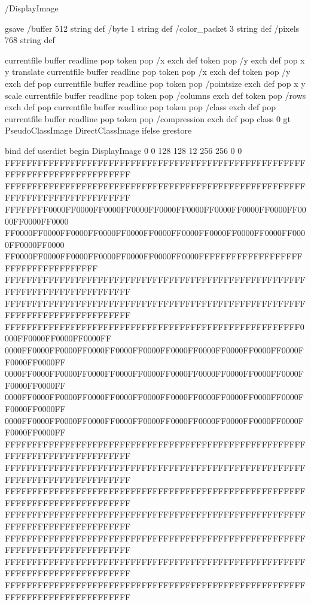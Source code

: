 /DisplayImage
{
  gsave
  /buffer 512 string def
  /byte 1 string def
  /color_packet 3 string def
  /pixels 768 string def

  currentfile buffer readline pop
  token pop /x exch def
  token pop /y exch def pop
  x y translate
  currentfile buffer readline pop
  token pop /x exch def
  token pop /y exch def pop
  currentfile buffer readline pop
  token pop /pointsize exch def pop
  x y scale
  currentfile buffer readline pop
  token pop /columns exch def
  token pop /rows exch def pop
  currentfile buffer readline pop
  token pop /class exch def pop
  currentfile buffer readline pop
  token pop /compression exch def pop
  class 0 gt { PseudoClassImage } { DirectClassImage } ifelse
  grestore
} bind def
userdict begin
DisplayImage
0 0
128 128
12
256 256
0
0
FFFFFFFFFFFFFFFFFFFFFFFFFFFFFFFFFFFFFFFFFFFFFFFFFFFFFFFFFFFFFFFFFFFFFFFFFFFFFF
FFFFFFFFFFFFFFFFFFFFFFFFFFFFFFFFFFFFFFFFFFFFFFFFFFFFFFFFFFFFFFFFFFFFFFFFFFFFFF
FFFFFFFF0000FF0000FF0000FF0000FF0000FF0000FF0000FF0000FF0000FF0000FF0000FF0000
FF0000FF0000FF0000FF0000FF0000FF0000FF0000FF0000FF0000FF0000FF0000FF0000FF0000
FF0000FF0000FF0000FF0000FF0000FF0000FF0000FFFFFFFFFFFFFFFFFFFFFFFFFFFFFFFFFFFF
FFFFFFFFFFFFFFFFFFFFFFFFFFFFFFFFFFFFFFFFFFFFFFFFFFFFFFFFFFFFFFFFFFFFFFFFFFFFFF
FFFFFFFFFFFFFFFFFFFFFFFFFFFFFFFFFFFFFFFFFFFFFFFFFFFFFFFFFFFFFFFFFFFFFFFFFFFFFF
FFFFFFFFFFFFFFFFFFFFFFFFFFFFFFFFFFFFFFFFFFFFFFFFFFFFFF0000FF0000FF0000FF0000FF
0000FF0000FF0000FF0000FF0000FF0000FF0000FF0000FF0000FF0000FF0000FF0000FF0000FF
0000FF0000FF0000FF0000FF0000FF0000FF0000FF0000FF0000FF0000FF0000FF0000FF0000FF
0000FF0000FF0000FF0000FF0000FF0000FF0000FF0000FF0000FF0000FF0000FF0000FF0000FF
0000FF0000FF0000FF0000FF0000FF0000FF0000FF0000FF0000FF0000FF0000FF0000FF0000FF
FFFFFFFFFFFFFFFFFFFFFFFFFFFFFFFFFFFFFFFFFFFFFFFFFFFFFFFFFFFFFFFFFFFFFFFFFFFFFF
FFFFFFFFFFFFFFFFFFFFFFFFFFFFFFFFFFFFFFFFFFFFFFFFFFFFFFFFFFFFFFFFFFFFFFFFFFFFFF
FFFFFFFFFFFFFFFFFFFFFFFFFFFFFFFFFFFFFFFFFFFFFFFFFFFFFFFFFFFFFFFFFFFFFFFFFFFFFF
FFFFFFFFFFFFFFFFFFFFFFFFFFFFFFFFFFFFFFFFFFFFFFFFFFFFFFFFFFFFFFFFFFFFFFFFFFFFFF
FFFFFFFFFFFFFFFFFFFFFFFFFFFFFFFFFFFFFFFFFFFFFFFFFFFFFFFFFFFFFFFFFFFFFFFFFFFFFF
FFFFFFFFFFFFFFFFFFFFFFFFFFFFFFFFFFFFFFFFFFFFFFFFFFFFFFFFFFFFFFFFFFFFFFFFFFFFFF
FFFFFFFFFFFFFFFFFFFFFFFFFFFFFFFFFFFFFFFFFFFFFFFFFFFFFFFFFFFFFFFFFFFFFFFFFFFFFF
